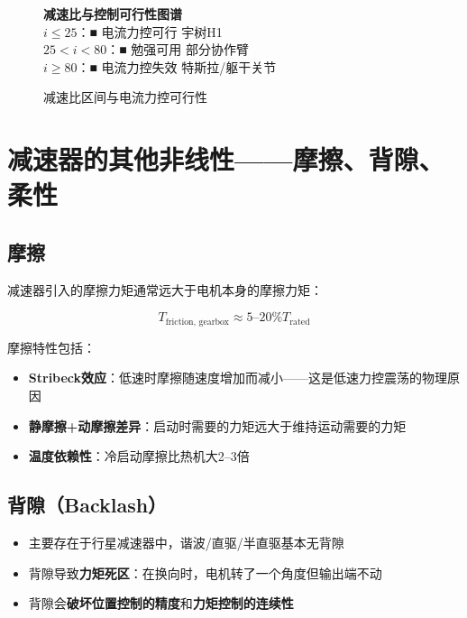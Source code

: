 \begin{figure}[H]
\centering
\begin{tcolorbox}[colback=lightgray]
\centering
\textbf{减速比与控制可行性图谱}\\
\vspace{5pt}
$i \leq 25$：\hfill \textcolor{successgreen}{■ 电流力控可行} \hfill 宇树H1\\
$25 < i < 80$：\hfill \textcolor{infoyellow}{■ 勉强可用} \hfill 部分协作臂\\
$i \geq 80$：\hfill \textcolor{warnred}{■ 电流力控失效} \hfill 特斯拉/躯干关节\\
\end{tcolorbox}
\caption{减速比区间与电流力控可行性}
\label{fig:ratio_zones}
\end{figure}

\section{减速器的其他非线性——摩擦、背隙、柔性}

\subsection{摩擦}

减速器引入的摩擦力矩通常远大于电机本身的摩擦力矩：

\begin{equation}
T_{\text{friction, gearbox}} \approx 5\text{--}20\% T_{\text{rated}}
\end{equation}

摩擦特性包括：
\begin{itemize}
  \item \textbf{Stribeck效应}：低速时摩擦随速度增加而减小——这是低速力控震荡的物理原因
  \item \textbf{静摩擦+动摩擦差异}：启动时需要的力矩远大于维持运动需要的力矩
  \item \textbf{温度依赖性}：冷启动摩擦比热机大2--3倍
\end{itemize}

\subsection{背隙（Backlash）}

\begin{itemize}
  \item 主要存在于行星减速器中，谐波/直驱/半直驱基本无背隙
  \item 背隙导致\textbf{力矩死区}：在换向时，电机转了一个角度但输出端不动
  \item 背隙会\textbf{破坏位置控制的精度}和\textbf{力矩控制的连续性}
\end{itemize}

